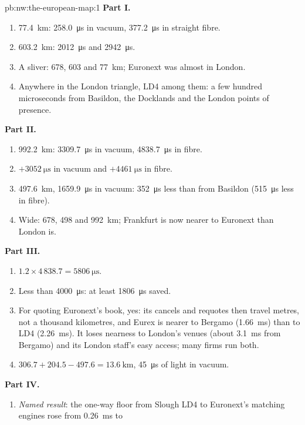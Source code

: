 \begin{solution}{pb:nw:the-european-map:1}
\textbf{Part I.}
\begin{enumerate}
\item \qty{77.4}{\kilo\metre}: \qty{258.0}{\micro\second} in vacuum, \qty{377.2}{\micro\second} in straight fibre.
\item \qty{603.2}{\kilo\metre}: \qty{2012}{\micro\second} and \qty{2942}{\micro\second}.
\item A sliver: 678, 603 and \qty{77}{\kilo\metre}; Euronext was almost in London.
\item Anywhere in the London triangle, LD4 among them: a few hundred microseconds from Basildon, the Docklands and the London points of
  presence.
\end{enumerate}
\textbf{Part II.}
\begin{enumerate}[resume]
\item \qty{992.2}{\kilo\metre}: \qty{3309.7}{\micro\second} in vacuum, \qty{4838.7}{\micro\second} in fibre.
\item $+\qty{3052}{\micro\second}$ in vacuum and $+\qty{4461}{\micro\second}$ in fibre.
\item \qty{497.6}{\kilo\metre}, \qty{1659.9}{\micro\second} in vacuum: \qty{352}{\micro\second} less than from Basildon
  (\qty{515}{\micro\second} less in fibre).
\item Wide: 678, 498 and \qty{992}{\kilo\metre}; Frankfurt is now nearer to Euronext than London is.
\end{enumerate}
\textbf{Part III.}
\begin{enumerate}[resume]
\item $1.2 \times 4\,838.7 = \qty{5806}{\micro\second}$.
\item Less than \qty{4000}{\micro\second}: at least \qty{1806}{\micro\second} saved.
\item For quoting Euronext's book, yes: its cancels and requotes then travel metres, not a thousand kilometres, and Eurex is nearer to Bergamo
  (\qty{1.66}{\milli\second}) than to LD4 (\qty{2.26}{\milli\second}). It loses nearness to London's venues (about \qty{3.1}{\milli\second}
  from Bergamo) and its London staff's easy access; many firms run both.
\item $306.7 + 204.5 - 497.6 = \qty{13.6}{\kilo\metre}$, \qty{45}{\micro\second} of light in vacuum.
\end{enumerate}
\textbf{Part IV.}
\begin{enumerate}[resume]
\item \emph{Named result}: the one-way floor from Slough LD4 to Euronext's matching engines rose from \qty{0.26}{\milli\second} to

\end{enumerate}
\end{solution}
